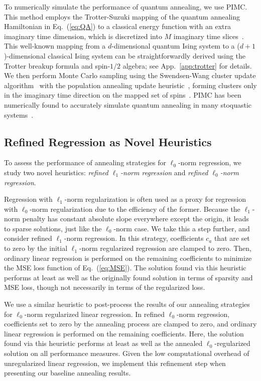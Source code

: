 \documentclass[aps,prd,twocolumn, superscriptaddress,preprintnumbers, nofootinbib,longbibliography,floatfix]{revtex4-2}
\DeclareRobustCommand{\App}[1]{App.~\ref{#1}}
\DeclareRobustCommand{\Eq}[1]{Eq.~(\ref{#1})}
\begin{document}
To numerically simulate the performance of quantum annealing, we use PIMC.
%
This method employs the Trotter-Suzuki mapping of the quantum annealing Hamiltonian in \Eq{eq:QA} to a classical energy function with an extra imaginary time dimension, which is discretized into $M$ imaginary time slices~\cite{doi:10.1143/PTP.56.1454}.
%
This well-known mapping from a $d$-dimensional quantum Ising system to a ($d+1$)-dimensional classical Ising system can be straightforwardly derived using the Trotter breakup formula and spin-$1/2$ algebra; see \App{app:trotter} for details.
%
We then perform Monte Carlo sampling using the Swendsen-Wang cluster update algorithm~\cite{PhysRevLett.58.86} with the population annealing update heuristic~\cite{doi:10.1063/1.1632130}, forming clusters only in the imaginary time direction on the mapped set of spins~\cite{PhysRevB.68.104409}.
%
PIMC has been numerically found to accurately simulate quantum annealing in many stoquastic systems~\cite{PhysRevLett.117.180402}.


\subsection{Refined Regression as Novel Heuristics} \label{sec:Heuristics}

To assess the performance of annealing strategies for $\ell_0$-norm regression, we study two novel heuristics:  \emph{refined $\ell_1$-norm regression} and \emph{refined $\ell_0$-norm regression}.

Regression with $\ell_1$-norm regularization is often used as a proxy for regression with $\ell_0$-norm regularization due to the efficiency of the former.
%
Because the $\ell_1$-norm penalty has constant absolute slope everywhere except the origin, it leads to sparse solutions, just like the $\ell_0$-norm case.
%
We take this a step further, and consider refined $\ell_1$-norm regression.
%
In this strategy, coefficients $c_a$ that are set to zero by the initial $\ell_1$-norm regularized regression are clamped to zero.
%
Then, ordinary linear regression is performed on the remaining coefficients to minimize the MSE loss function of \Eq{eq:MSE}.
%
The solution found via this heuristic performs at least as well as the originally found solution in terms of sparsity and MSE loss, though not necessarily in terms of the regularized loss. 


We use a similar heuristic to post-process the results of our annealing strategies for $\ell_0$-norm regularized linear regression.
%
In refined $\ell_0$-norm regression, coefficients set to zero by the annealing process are clamped to zero, and ordinary linear regression is performed on the remaining coefficients.
%
Here, the solution found via this heuristic performs at least as well as the annealed $\ell_0$-regularized solution on all performance measures.
%
Given the low computational overhead of unregularized linear regression, we implement this refinement step when presenting our baseline annealing results.
\end{document}
